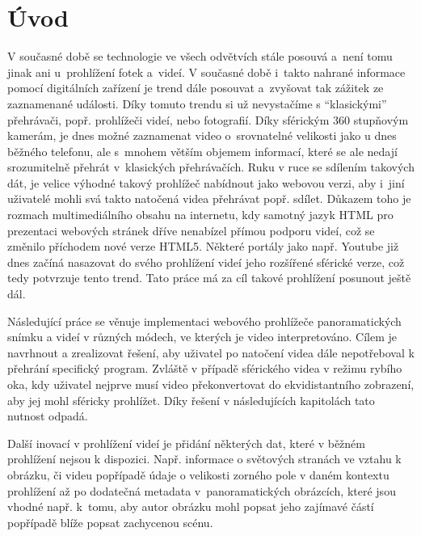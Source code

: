 \setcounter{secnumdepth}{4} %



\chapter{Úvod}
\label{chapter:1}

V současné době se technologie ve všech odvětvích stále posouvá a~není tomu jinak ani u~prohlížení fotek a~videí. V současné době i~takto nahrané informace pomocí digitálních zařízení je trend dále posouvat a~zvyšovat tak zážitek ze zaznamenané události. Díky tomuto trendu si už nevystačíme s ``klasickými''  přehrávači, popř. prohlížeči videí, nebo fotografií. Díky sférickým 360 stupňovým kamerám, je dnes možné zaznamenat video o~srovnatelné velikosti jako u dnes běžného telefonu, ale s~mnohem větším objemem informací, které se ale nedají srozumitelně přehrát v~klasických přehrávačích. Ruku v ruce se sdílením takových dát, je velice výhodné takový prohlížeč nabídnout jako webovou verzi, aby i~jiní uživatelé mohli svá takto natočená videa přehrávat popř. sdílet. Důkazem toho je rozmach multimediálního obsahu na internetu, kdy samotný jazyk HTML pro prezentaci webových stránek dříve nenabízel přímou podporu videí, což se změnilo příchodem nové verze HTML5. Některé portály jako např. Youtube již dnes začíná nasazovat do svého prohlížení videí jeho rozšířené sférické verze, což tedy potvrzuje tento trend. Tato práce má za cíl takové prohlížení posunout ještě dál.


Následující práce se věnuje implementaci webového prohlížeče panoramatických snímku a videí v různých módech, ve kterých je video interpretováno. Cílem je  navrhnout a zrealizovat řešení, aby uživatel po natočení videa dále nepotřeboval k přehrání specifický program. Zvláště v případě  sférického videa v režimu rybího oka, kdy uživatel nejprve musí video překonvertovat do ekvidistantního zobrazení, aby jej mohl sféricky prohlížet. Díky řešení v následujících kapitolách tato nutnost odpadá. 


Další inovací v prohlížení videí je přidání některých dat, které v běžném prohlížení nejsou k dispozici. Např. informace o světových stranách ve vztahu k obrázku, či videu popřípadě údaje o velikosti zorného pole v daném kontextu prohlížení až po dodatečná metadata v~panoramatických obrázcích, které jsou vhodné např. k~tomu, aby autor obrázku mohl popsat jeho zajímavé částí popřípadě blíže popsat zachycenou scénu.
\newline

